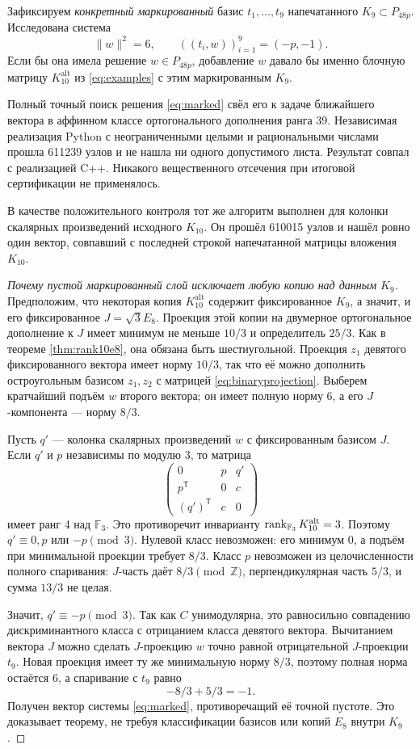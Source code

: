\documentclass[11pt,a4paper]{article}
\theoremstyle{remark}\newtheorem{remark}[theorem]{Замечание}
\newcommand{\Z}{\mathbb Z}\newcommand{\R}{\mathbb R}\newcommand{\F}{\mathbb F}
\newcommand{\Kalt}{K_{10}^{\mathrm{alt}}}
\begin{document}
Зафиксируем \emph{конкретный маркированный} базис $t_1,\ldots,t_9$ напечатанного $K_9\subset P_{48p}$. Исследована система
\begin{equation}\label{eq:marked}
\|w\|^2=6,\qquad ((t_i,w))_{i=1}^9=(-p,-1).
\end{equation}
Если бы она имела решение $w\in P_{48p}$, добавление $w$ давало бы именно блочную матрицу $\Kalt$ из \eqref{eq:examples} с этим маркированным $K_9$.

Полный точный поиск решения \eqref{eq:marked} свёл его к задаче ближайшего вектора в аффинном классе ортогонального дополнения ранга 39. Независимая реализация Python с неограниченными целыми и рациональными числами прошла 611239 узлов и не нашла ни одного допустимого листа. Результат совпал с реализацией C++. Никакого вещественного отсечения при итоговой сертификации не применялось.

В качестве положительного контроля тот же алгоритм выполнен для колонки скалярных произведений исходного $K_{10}$. Он прошёл 610015 узлов и нашёл ровно один вектор, совпавший с последней строкой напечатанной матрицы вложения $K_{10}$.

\begin{proof}[Почему пустой маркированный слой исключает любую копию над данным $K_9$]
Предположим, что некоторая копия $\Kalt$ содержит фиксированное $K_9$, а значит, и его фиксированное $J=\sqrt3E_8$. Проекция этой копии на двумерное ортогональное дополнение к $J$ имеет минимум не меньше $10/3$ и определитель $25/3$. Как в теореме \ref{thm:rank10e8}, она обязана быть шестиугольной. Проекция $z_1$ девятого фиксированного вектора имеет норму $10/3$, так что её можно дополнить остроугольным базисом $z_1,z_2$ с матрицей \eqref{eq:binaryprojection}. Выберем кратчайший подъём $w$ второго вектора; он имеет полную норму 6, а его $J$-компонента --- норму $8/3$.

Пусть $q'$ --- колонка скалярных произведений $w$ с фиксированным базисом $J$. Если $q'$ и $p$ независимы по модулю 3, то матрица
\[
\begin{pmatrix}0&p&q'\\p^{\mathsf T}&0&c\\(q')^{\mathsf T}&c&0\end{pmatrix}
\]
имеет ранг 4 над $\F_3$. Это противоречит инварианту $\rank_{\F_3}\Kalt=3$. Поэтому $q'\equiv0,p$ или $-p\pmod3$. Нулевой класс невозможен: его минимум 0, а подъём при минимальной проекции требует $8/3$. Класс $p$ невозможен из целочисленности полного спаривания: $J$-часть даёт $8/3\pmod\Z$, перпендикулярная часть $5/3$, и сумма $13/3$ не целая.

Значит, $q'\equiv-p\pmod3$. Так как $C$ унимодулярна, это равносильно совпадению дискриминантного класса с отрицанием класса девятого вектора. Вычитанием вектора $J$ можно сделать $J$-проекцию $w$ точно равной отрицательной $J$-проекции $t_9$. Новая проекция имеет ту же минимальную норму $8/3$, поэтому полная норма остаётся 6, а спаривание с $t_9$ равно
\[
-8/3+5/3=-1.
\]
Получен вектор системы \eqref{eq:marked}, противоречащий её точной пустоте. Это доказывает теорему, не требуя классификации базисов или копий $E_8$ внутри $K_9$.
\end{proof}
\end{document}

